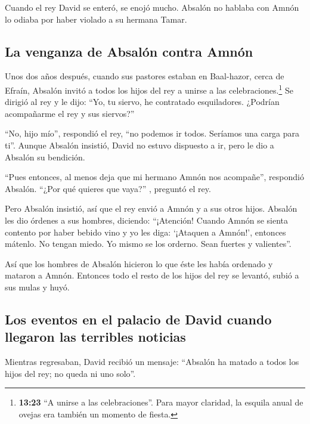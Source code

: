  Cuando el rey David se enteró, se enojó mucho.
 Absalón no hablaba con Amnón lo odiaba por haber violado
a su hermana Tamar.

\hypertarget{la-venganza-de-absaluxf3n-contra-amnuxf3n}{%
\subsection{La venganza de Absalón contra
Amnón}\label{la-venganza-de-absaluxf3n-contra-amnuxf3n}}

 Unos dos años después, cuando sus pastores estaban en
Baal-hazor, cerca de Efraín, Absalón invitó a todos los hijos del rey a
unirse a las celebraciones.\footnote{\textbf{13:23} ``A unirse a las
  celebraciones''. Para mayor claridad, la esquila anual de ovejas era
  también un momento de fiesta.}  Se dirigió al rey y le
dijo: ``Yo, tu siervo, he contratado esquiladores. ¿Podrían acompañarme
el rey y sus siervos?''

 ``No, hijo mío'', respondió el rey, ``no podemos ir
todos. Seríamos una carga para ti''. Aunque Absalón insistió, David no
estuvo dispuesto a ir, pero le dio a Absalón su bendición.

 ``Pues entonces, al menos deja que mi hermano Amnón nos
acompañe'', respondió Absalón. ``¿Por qué quieres que vaya?'' , preguntó
el rey.

 Pero Absalón insistió, así que el rey envió a Amnón y a
sus otros hijos.  Absalón les dio órdenes a sus hombres,
diciendo: ``¡Atención! Cuando Amnón se sienta contento por haber bebido
vino y yo les diga: `¡Ataquen a Amnón!', entonces mátenlo. No tengan
miedo. Yo mismo se los orderno. Sean fuertes y valientes''.

 Así que los hombres de Absalón hicieron lo que éste les
había ordenado y mataron a Amnón. Entonces todo el resto de los hijos
del rey se levantó, subió a sus mulas y huyó.

\hypertarget{los-eventos-en-el-palacio-de-david-cuando-llegaron-las-terribles-noticias}{%
\subsection{Los eventos en el palacio de David cuando llegaron las
terribles
noticias}\label{los-eventos-en-el-palacio-de-david-cuando-llegaron-las-terribles-noticias}}

 Mientras regresaban, David recibió un mensaje: ``Absalón
ha matado a todos los hijos del rey; no queda ni uno solo''.

